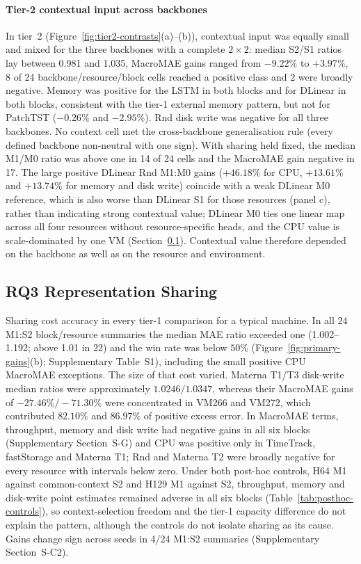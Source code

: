\documentclass[5p,twocolumn]{elsarticle}
\begin{document}
\paragraph{Tier-2 contextual input across backbones}
In tier~2 (Figure~\ref{fig:tier2-contrasts}(a)--(b)), contextual input was
equally small and mixed for the three backbones with a complete $2\times2$:
median S2/S1 ratios lay between 0.981 and 1.035, MacroMAE gains ranged from
$-9.22\%$ to $+3.97\%$, 8 of 24 backbone/resource/block cells reached a
positive class and 2 were broadly negative.
Memory was positive for the LSTM in both blocks and for DLinear in both
blocks, consistent with the tier-1 external memory pattern, but not for
PatchTST ($-0.26\%$ and $-2.95\%$). Rnd disk write was negative for all
three backbones. No context cell met the cross-backbone generalisation rule
(every defined backbone non-neutral with one sign). With sharing held fixed,
the median M1/M0 ratio was above one in 14 of 24 cells and the MacroMAE gain
negative in 17. The large positive DLinear Rnd
M1:M0 gains ($+46.18\%$ for CPU, $+13.61\%$ and $+13.74\%$ for memory and disk
write) coincide with a weak DLinear M0 reference, which is also worse than
DLinear S1 for those resources (panel c), rather than indicating strong
contextual value; DLinear M0 ties one linear map across all four resources without
resource-specific heads, and the CPU value is scale-dominated by one VM
(Section~\ref{sec:results-rq2}). Contextual value therefore depended on the
backbone as well as on the resource and environment.

\subsection{RQ3 Representation Sharing}
\label{sec:results-rq2}

Sharing cost accuracy in every tier-1 comparison for a typical machine. In
all 24 M1:S2 block/resource summaries the median MAE ratio exceeded one
(1.002--1.192; above 1.01 in 22) and the win rate was below $50\%$
(Figure~\ref{fig:primary-gains}(b); Supplementary Table~S1), including the
small positive CPU MacroMAE exceptions. The size of that cost varied. Materna T1/T3 disk-write median
ratios were approximately $1.0246/1.0347$, whereas their MacroMAE gains of
$-27.46\%/-71.30\%$ were concentrated in VM266 and VM272, which contributed
$82.10\%$ and $86.97\%$ of positive excess error. In MacroMAE terms,
throughput, memory and disk write had negative gains in all six blocks
(Supplementary Section~S-G) and CPU was positive only in TimeTrack,
fastStorage and Materna T1; Rnd and Materna T2 were broadly negative for
every resource with intervals below zero. Under both post-hoc controls, H64
M1 against common-context S2 and H129 M1 against S2, throughput, memory and
disk-write point estimates remained adverse in all six blocks
(Table~\ref{tab:posthoc-controls}), so context-selection freedom and the
tier-1 capacity difference do not explain the pattern, although the
controls do not isolate sharing as its cause. Gains change sign across seeds
in 4/24 M1:S2 summaries (Supplementary Section~S-C2).
\end{document}
